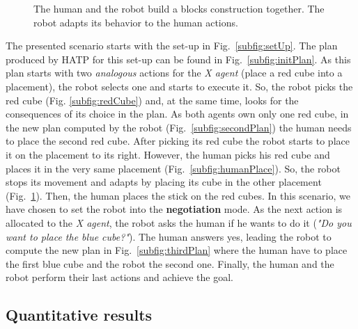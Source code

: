 \documentclass[english,a4paper,11pt,twoside]{StyleThese}
\begin{document}
\begin{figure}[!h]
{       \label{subfig:robotAdapts}
   }\hfill
    \caption{The human and the robot build a blocks construction together. The robot adapts its behavior to the human actions.}
\end{figure}


The presented scenario starts with the set-up in Fig.~\ref{subfig:setUp}. The plan produced by HATP for this set-up can be found in Fig.~\ref{subfig:initPlan}. As this plan starts with two \textit{analogous} actions for the \textit{X agent} (place a red cube into a placement), the robot selects one and starts to execute it. So, the robot picks the red cube (Fig. \ref{subfig:redCube}) and, at the same time, looks for the consequences of its choice in the plan. As both agents own only one red cube, in the new plan computed by the robot (Fig.~\ref{subfig:secondPlan}) the human needs to place the second red cube. After picking its red cube the robot starts to place it on the placement to its right. However, the human picks his red cube and places it in the very same placement (Fig.~\ref{subfig:humanPlace}). So, the robot stops its movement and adapts by placing its cube in the other placement (Fig.~\ref{subfig:robotAdapts}). Then, the human places the stick on the red cubes. In this scenario, we have chosen to set the robot into the \textbf{negotiation} mode. As the next action is allocated to the \textit{X agent}, the robot asks the human if he wants to do it (\textit{"Do you want to place the blue cube?"}). The human answers yes, leading the robot to compute the new plan in Fig.~\ref{subfig:thirdPlan} where the human have to place the first blue cube and the robot the second one. Finally, the human and the robot perform their last actions and achieve the goal.


\subsection{Quantitative results}
\end{document}
